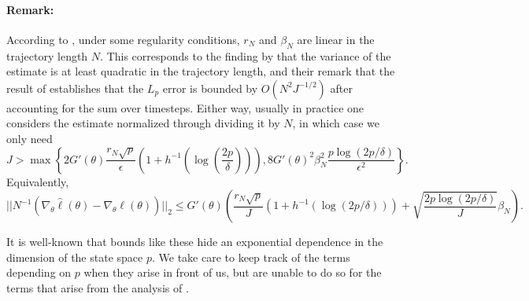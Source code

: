 \documentclass{article}
\begin{document}
\paragraph{Remark:} According to \cite{delmoral2011ci}, under some regularity conditions, $r_N$ and $\beta_N$ are linear in the trajectory length $N$. This corresponds to the finding by \cite{poyiadjis11} that the variance of the estimate is at least quadratic in the trajectory length, and their remark that the result of \cite{delMoral03} establishes that the $L_p$ error is bounded by $O(N^2J^{-1/2})$ after accounting for the sum over timesteps. Either way, usually in practice one considers the estimate normalized through dividing it by $N$, in which case we only need
$$J > \max\left\{2G'(\theta)\frac{r_N\sqrt{p}}{\epsilon}\left(1+h^{-1}\left(\log\left(\frac{2p}{\delta}\right)\right)\right), 8G'(\theta)^2\beta_N^2\frac{p\log(2p/\delta)}{\epsilon^2}\right\}.$$
Equivalently,
$$||N^{-1}(\nabla_\theta \hat\ell(\theta) - \nabla_\theta \ell(\theta))||_2 \leq G'(\theta)\left(\frac{r_N\sqrt{p}}{J}(1+h^{-1}(\log(2p/\delta))) + \sqrt{\frac{2p\log(2p/\delta)}{J}}\beta_N\right).$$

It is well-known that bounds like these hide an exponential dependence in the dimension of the state space $p$. We take care to keep track of the terms depending on $p$ when they arise in front of us, but are unable to do so for the terms that arise from the analysis of \cite{delmoral2011ci}. 

\end{document}
